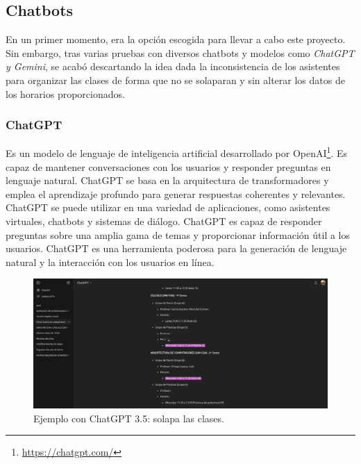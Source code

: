 \subsection{Chatbots}
En un primer momento, era la opción escogida para llevar a cabo este proyecto. Sin embargo, tras varias pruebas con diversos chatbots y modelos como \emph{ChatGPT y Gemini}, se acabó descartando la idea dada la inconsistencia de los asistentes para organizar las clases de forma que no se solaparan y sin alterar los datos de los horarios proporcionados.

\subsubsection*{ChatGPT}
Es un modelo de lenguaje de inteligencia artificial desarrollado por OpenAI\footnote{\url{https://chatgpt.com/}}. Es capaz de mantener conversaciones con los usuarios y responder preguntas en lenguaje natural. ChatGPT se basa en la arquitectura de transformadores y emplea el aprendizaje profundo para generar respuestas coherentes y relevantes. ChatGPT se puede utilizar en una variedad de aplicaciones, como asistentes virtuales, chatbots y sistemas de diálogo. ChatGPT es capaz de responder preguntas sobre una amplia gama de temas y proporcionar información útil a los usuarios. ChatGPT es una herramienta poderosa para la generación de lenguaje natural y la interacción con los usuarios en línea.

\begin{landscape}
    \begin{figure}[H]
        \centering
        \includegraphics[width=1.5\textwidth, angle=0]{./imagenes/ChatGPT.png}
        \caption{Ejemplo con ChatGPT 3.5: solapa las clases.}
    \end{figure}
\end{landscape}

